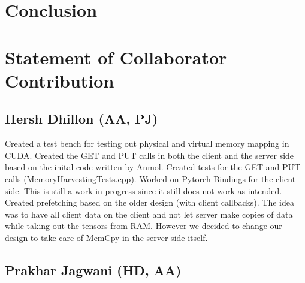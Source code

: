 \documentclass{article}
\begin{document}
\section{Conclusion}

\section{Statement of Collaborator Contribution}
\subsection{Hersh Dhillon (AA, PJ)}

Created a test bench for testing out physical and virtual memory mapping in CUDA.
Created the GET and PUT calls in both the client and the server side based on the inital code written by Anmol.
Created tests for the GET and PUT calls (MemoryHarvestingTests.cpp).
Worked on Pytorch Bindings for the client side. This is still a work in progress since it still does not work as intended.
Created prefetching based on the older design (with client callbacks). The idea was to have all client data on the client and not let server make copies of data while taking out the tensors from RAM. However we decided to change our design to take care of MemCpy in the server side itself.

\subsection{Prakhar Jagwani (HD, AA)}
\end{document}
